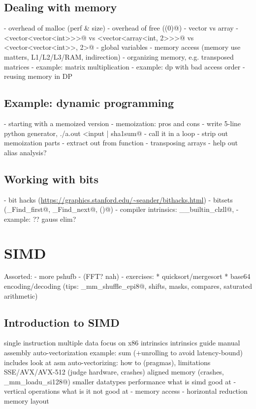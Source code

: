 \documentclass[openany]{book}
\begin{document}
\chapter{Dealing with memory}
- overhead of malloc (perf \& size)
- overhead of free (\verb@exit(0)@)
- vector vs array
- \verb@vector<vector<vector<int>>>@ vs \verb@vector<vector<array<int, 2>>>@ vs \verb@array<vector<vector<int>>, 2>@
- global variables
- memory access (memory use matters, L1/L2/L3/RAM, indirection)
- organizing memory, e.g. transposed matrices
- example: matrix multiplication
- example: dp with bad access order
- reusing memory in DP
\chapter{Example: dynamic programming}
- starting with a memoized version
- memoization: pros and cons
- write 5-line python generator, \verb@./a.out <input | sha1sum@
- call it in a loop
- strip out memoization parts
- extract out from function
- transposing arrays
- help out alias analysis?
\chapter{Working with bits}
- bit hacks (\url{https://graphics.stanford.edu/~seander/bithacks.html})
- bitsets (\verb@_Find_first@, \verb@_Find_next@, \verb@count()@)
- compiler intrinsics: \verb@__builtin_clzll@, \verb@popcountll@
- example: ?? gauss elim?

\part{SIMD}

Assorted:
- more pshufb
- (FFT? nah)
- exercises:
 * quicksort/mergesort
 * base64 encoding/decoding (tips: \verb@_mm_shuffle_epi8@, shifts, masks, compares, saturated arithmetic)

\chapter{Introduction to SIMD}
single instruction multiple data
focus on x86
intrinsics
intrinsics guide
manual assembly
auto-vectorization
example: sum (+unrolling to avoid latency-bound)
includes
look at asm
auto-vectorizing: how to (pragmas), limitations
SSE/AVX/AVX-512 (judge hardware, crashes)
aligned memory (crashes, \verb@_mm_loadu_si128@)
smaller datatypes
performance
what is simd good at
- vertical operations
what is it not good at
- memory access
- horizontal reduction
memory layout
\end{document}
